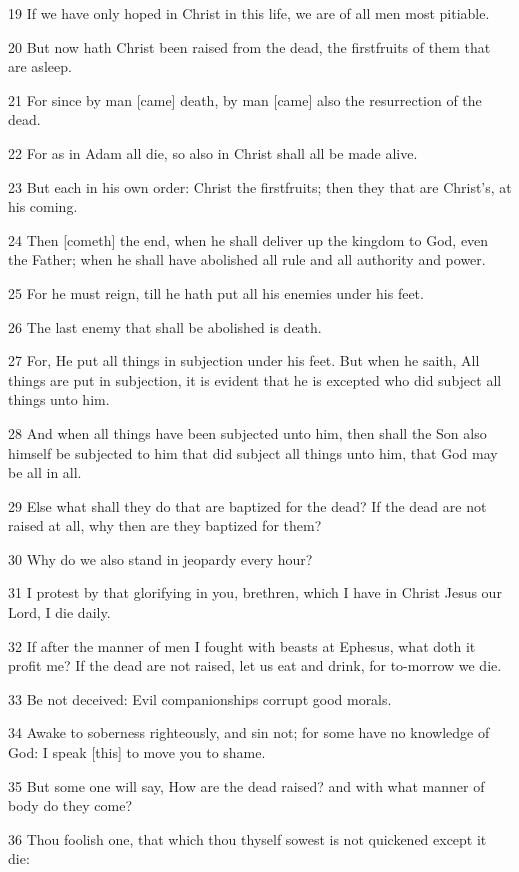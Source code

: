 \par 19 If we have only hoped in Christ in this life, we are of all men most pitiable.
\par 20 But now hath Christ been raised from the dead, the firstfruits of them that are asleep.
\par 21 For since by man [came] death, by man [came] also the resurrection of the dead.
\par 22 For as in Adam all die, so also in Christ shall all be made alive.
\par 23 But each in his own order: Christ the firstfruits; then they that are Christ's, at his coming.
\par 24 Then [cometh] the end, when he shall deliver up the kingdom to God, even the Father; when he shall have abolished all rule and all authority and power.
\par 25 For he must reign, till he hath put all his enemies under his feet.
\par 26 The last enemy that shall be abolished is death.
\par 27 For, He put all things in subjection under his feet. But when he saith, All things are put in subjection, it is evident that he is excepted who did subject all things unto him.
\par 28 And when all things have been subjected unto him, then shall the Son also himself be subjected to him that did subject all things unto him, that God may be all in all.
\par 29 Else what shall they do that are baptized for the dead? If the dead are not raised at all, why then are they baptized for them?
\par 30 Why do we also stand in jeopardy every hour?
\par 31 I protest by that glorifying in you, brethren, which I have in Christ Jesus our Lord, I die daily.
\par 32 If after the manner of men I fought with beasts at Ephesus, what doth it profit me? If the dead are not raised, let us eat and drink, for to-morrow we die.
\par 33 Be not deceived: Evil companionships corrupt good morals.
\par 34 Awake to soberness righteously, and sin not; for some have no knowledge of God: I speak [this] to move you to shame.
\par 35 But some one will say, How are the dead raised? and with what manner of body do they come?
\par 36 Thou foolish one, that which thou thyself sowest is not quickened except it die:

